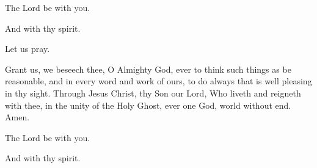 

\rubric{\Vbar}The Lord be with you.

\rubric{\Rbar}And with thy spirit.

Let us pray.

Grant us, we beseech thee, O Almighty God, ever to think such things as be reasonable, and in every word and work of ours, to do always that is well pleasing in thy sight. Through Jesus Christ, thy Son our Lord, Who liveth and reigneth with thee, in the unity of the Holy Ghost, ever one God, world without end.\rubric{\Rbar} Amen.

\rubric{\Vbar}The Lord be with you.

\rubric{\Rbar}And with thy spirit.
